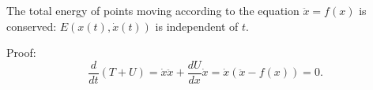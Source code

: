 The total energy of points moving according to the equation $\ddot{x} = f(x)$ is conserved: $E(x(t), \dot{x}(t))$ is independent of $t$.

Proof:
$$\frac{d}{dt}(T + U) = \dot{x}\ddot{x} + \frac{dU}{dx}\dot{x} = \dot{x}(\ddot{x} - f(x)) = 0.$$
